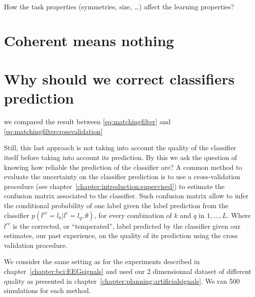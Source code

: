 How the task properties (symmetries, size, \ldots) affect the learning properties?




\section{Coherent means nothing}




\section{Why should we correct classifiers prediction}


we compared the result between 
\ref{eq:matchingfilter}
and
\ref{eq:matchingfiltercrossvalidation} 

Still, this last approach is not taking into account the quality of the classifier itself before taking into account its prediction. By this we ask the question of knowing how reliable the prediction of the classifier are? A common method to evaluate the uncertainty on the classifier prediction is to use a cross-validation procedure (see chapter~\ref{chapter:introduction:supervised}) to estimate the confusion matrix associated to the classifier. Such confusion matrix allow to infer the conditional probability of one label given the label prediction from the classifier $p(l^{cc} = l_k| l^c = l_q, \theta)$, for every combination of $k$ and $q$ in $1, \ldots, L$. Where $l^{cc}$ is the corrected, or ``temperated'', label predicted by the classifier given our estimates, our past experience, on the quality of its prediction using the cross validation procedure.

We consider the same setting as for the experiments described in chapter~\ref{chapter:bci:EEGsignals} and used our 2 dimensionnal dataset of different quality as presented in chapter~\ref{chapter:planning:artificialsignals}. We ran 500 simulations for each method.




